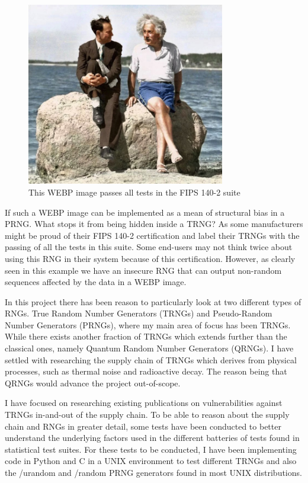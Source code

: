 \documentclass[]{final_report}
\begin{document}
\begin{figure}[h!]
\begin{center}
\includegraphics[height=8cm]{Smith2016_einstein}
\caption{This WEBP image passes all tests in the FIPS 140-2 suite\cite{Smith:2020}}
\label{fig:Smith2016_einstein}
\end{center}
\end{figure}

\par{If such a WEBP image can be implemented as a mean of structural bias in a PRNG. What stops it from being hidden inside a TRNG? As some manufacturers might be proud of their FIPS 140-2 certification and label their TRNGs with the passing of all the tests in this suite. Some end-users may not think twice about using this RNG in their system because of this certification. However, as clearly seen in this example we have an insecure RNG that can output non-random sequences affected by the data in a WEBP image.}

\par{In this project there has been reason to particularly look at two different types of RNGs. True Random Number Generators (TRNGs) and Pseudo-Random Number Generators (PRNGs), where my main area of focus has been TRNGs. While there exists another fraction of TRNGs which extends further than the classical ones, namely Quantum Random Number Generators (QRNGs). I have settled with researching the supply chain of TRNGs which derives from physical processes, such as thermal noise and radioactive decay. The reason being that QRNGs would advance the project out-of-scope.}

\par{I have focused on researching existing publications on vulnerabilities against TRNGs in-and-out of the supply chain. To be able to reason about the supply chain and RNGs in greater detail, some tests have been conducted to better understand the underlying factors used in the different batteries of tests found in statistical test suites. For these tests to be conducted, I have been implementing code in Python and C in a UNIX environment to test different TRNGs and also the /urandom and /random PRNG generators found in most UNIX distributions.}
\end{document}
